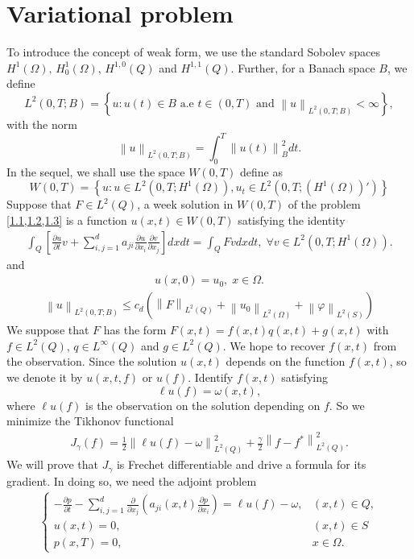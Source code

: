\documentclass[]{article}
\begin{document}
\section{Variational problem}
To introduce the concept of weak form, we use the standard Sobolev spaces $H^1(\Omega),\, H^1_0(\Omega),\, H^{1, 0}(Q)$ and $H^{1, 1}(Q)$. Further, for a Banach space $B$, we define
$$L^2(0, T; B)=\left\{u:u(t)\in B \text{ a.e } t\in (0, T) \text{ and } \left\|u\right\|_{L^2(0, T; B)} <\infty \right\},$$
with the norm
$$\left\|u\right\|_{L^2(0, T; B)}=\int_0^T\left\|u(t)\right\|^2_Bdt.$$
In the sequel, we shall use the space $W(0, T)$ define as
$$W(0, T)=\left\{u: u\in L^2(0, T; H^1(\Omega)), u_t\in L^2\left(0, T; \left(H^1(\Omega)\right)'\right) \right\}$$
Suppose that $F\in L^2(Q)$, a week solution in $W(0, T)$ of the problem \cref{1.1,1.2,1.3} is a function $u(x, t)\in W(0, T)$ satisfying the identity
\begin{align}\label{2.1}
	\int_{Q}\left[\frac{\partial u}{\partial t}v+\sum_{i, j=1}^{d}a_{ji}\frac{\partial u}{\partial x_i}\frac{\partial v}{\partial x_j}\right]dxdt=\int_{Q}Fvdxdt,\;\forall v \in L^2\left(0, T; H^1(\Omega)\right).
\end{align}
and 
\begin{align}\label{2.2}
	u(x, 0)=u_0,\; x\in \Omega.
\end{align}
\begin{align}\label{2.3}
	\left\|u\right\|_{L^2(0, T; B)} \leq c_d \left(\left\|F\right\|_{L^2(Q)}+\left\|u_0\right\|_{L^2(\Omega)}+\left\|\varphi\right\|_{L^2(S)}\right)
\end{align}
We suppose that $F$ has the form $F(x, t)=f(x, t)q(x, t)+g(x, t)$ with $f\in L^2(Q),\, q\in L^\infty(Q)$ and $g\in L^2(Q)$. We hope to recover $f(x, t)$ from the observation. Since the solution $u(x, t)$ depends on the function $f(x, t)$, so we denote it by $u(x, t, f)$ or $u(f)$. Identify $f(x, t)$ satisfying 
$$\ell u(f)=\omega(x, t),$$
where $\ell u(f)$ is the observation on the solution depending on $f$. So we minimize the Tikhonov functional
\begin{align}\label{2.4}
	J_{\gamma}(f)=\frac{1}{2}\left\|\ell u(f)-\omega\right\|_{L^2(Q)}^2+\frac{\gamma}{2}\left\|f-f^*\right\|_{L^2(Q)}^2.
\end{align}
We will prove that $J_\gamma$ is Frechet differentiable and drive a formula for its gradient. In doing so, we need the adjoint problem
\begin{align}\label{2.5}
	\begin{cases}
		-\frac{\partial p}{\partial t}-\sum_{i, j=1}^{d}\frac{\partial}{\partial x_j}\left(a_{ji}(x, t)\frac{\partial p}{\partial x_i}\right)=\ell u(f)-\omega, & (x, t)\in Q,\\
		u(x, t)=0, & (x, t)\in S\\
		p(x, T)=0, & x\in \Omega.
	\end{cases}
\end{align}
\end{document}
